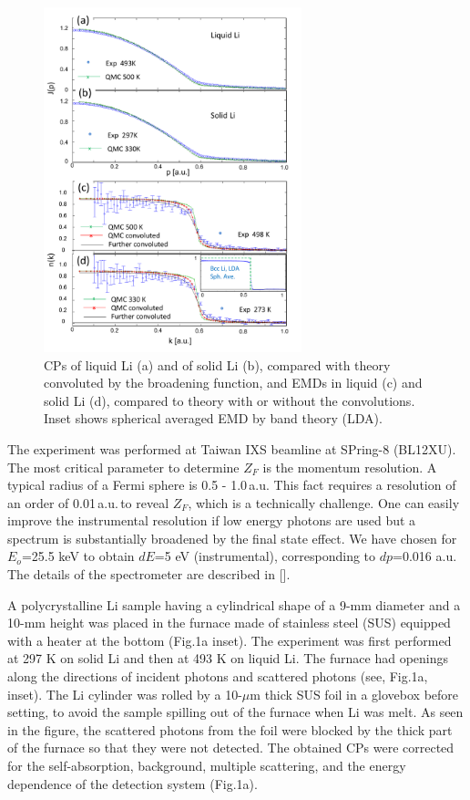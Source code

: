 \documentclass[twocolumn,showpacs,showkeys,fleqn,prl,superscriptaddress]{revtex4}%
\begin{document}
\begin{figure}
\includegraphics[bb= 50 10 500 720, width=7.5cm]{fig2.pdf}
\caption{CPs of liquid Li (a) and of solid Li (b), compared with theory convoluted by the broadening function, and EMDs in liquid (c) and solid Li (d), compared to theory with or without the convolutions. Inset shows spherical averaged EMD by band theory (LDA).  
} 
\label{Fig.2}
\end{figure}

The experiment was performed at Taiwan IXS beamline at SPring-8 (BL12XU).
The most critical parameter to determine $Z_F$ is the momentum resolution. 
A typical radius of a Fermi sphere is 0.5 - 1.0\,a.u. This fact requires a resolution of an order of 0.01\,a.u.\,to reveal $Z_F$, which is a technically challenge.
One can easily improve the instrumental resolution if low energy photons are used but a spectrum is substantially broadened by the final state effect\cite{stern00,soi01}.
We have chosen for $E_o$=25.5 keV to obtain $dE$=5 eV (instrumental), corresponding to $dp$=0.016 a.u.
The details of the spectrometer are described in []. 


A polycrystalline Li sample having a cylindrical shape of a 9-mm diameter and a 10-mm height was placed in the furnace made of stainless steel (SUS) equipped with a heater at the bottom (Fig.1a inset).
The experiment was first performed at 297 K on solid Li and then at 493 K on liquid Li. 
The furnace had openings along the directions of incident photons and scattered photons (see, Fig.1a, inset).
The Li cylinder was rolled by a 10-$\mu$m thick SUS foil in a glovebox before setting, to avoid the sample spilling out of the furnace when Li was melt.
As seen in the figure, the scattered photons from the foil were blocked by the thick part of the furnace so that they were not detected.
The obtained CPs were corrected for the self-absorption, background, multiple scattering, and the energy dependence of the detection system (Fig.1a).
\end{document}
